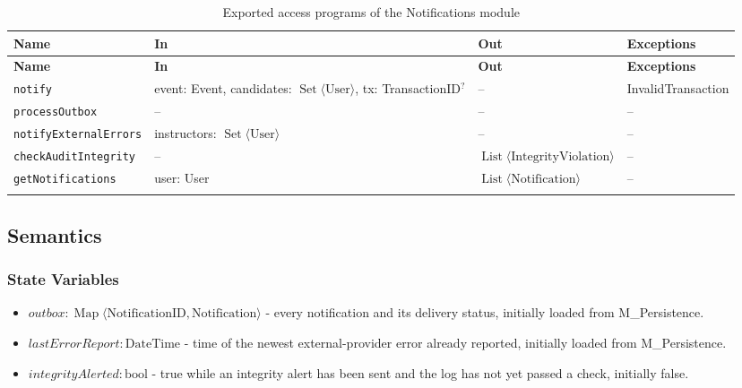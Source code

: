 \documentclass[12pt, titlepage]{article}
\begin{document}
\begingroup
\small
\setlength{\tabcolsep}{4pt}
\renewcommand{\arraystretch}{1.2}
\begin{longtable}{>{\raggedright\arraybackslash}p{}
        >{\raggedright\arraybackslash}p{}
        >{\raggedright\arraybackslash}p{}
        >{\raggedright\arraybackslash}p{}}
    \toprule
    \textbf{Name} & \textbf{In} & \textbf{Out} & \textbf{Exceptions} \\
    \midrule
    \endfirsthead
    \toprule
    \textbf{Name} & \textbf{In} & \textbf{Out} & \textbf{Exceptions} \\
    \midrule
    \endhead
    \endfoot
    \texttt{notify} & event: Event, candidates: $\operatorname{Set}\langle\text{User}\rangle$, tx: TransactionID$^{?}$ & -- & InvalidTransaction \\
    \texttt{processOutbox} & -- & -- & -- \\
    \texttt{notifyExternalErrors} & instructors: $\operatorname{Set}\langle\text{User}\rangle$ & -- & -- \\
    \texttt{checkAuditIntegrity} & -- & $\operatorname{List}\langle\text{IntegrityViolation}\rangle$ & -- \\
    \texttt{getNotifications} & user: User & $\operatorname{List}\langle\text{Notification}\rangle$ & -- \\
    \bottomrule
    \caption{Exported access programs of the Notifications module}
    \label{TblNotificationsAccessPrograms}
\end{longtable}
\endgroup

\subsection{Semantics}

\subsubsection{State Variables}

\begin{itemize}
    \item $\mathit{outbox}:\operatorname{Map}\langle\text{NotificationID},\text{Notification}\rangle$ -
    every notification and its delivery status, initially loaded from M\_Persistence.
    \item $\mathit{lastErrorReport}:\text{DateTime}$ - time of the newest external-provider error already reported,
    initially loaded from M\_Persistence.
    \item $\mathit{integrityAlerted}:\text{bool}$ - true while an integrity alert has been sent and the log has
    not yet passed a check, initially false.
\end{itemize}
\end{document}
